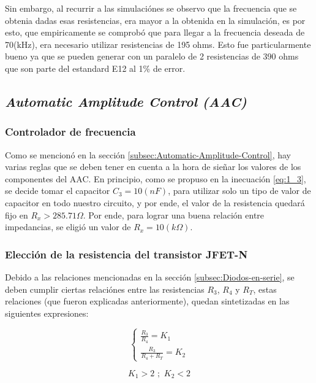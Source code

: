 Sin embargo, al recurrir a las simulaciónes se observo que la frecuencia
que se obtenia dadas esas resistencias, era mayor a la obtenida en
la simulación, es por esto, que empiricamente se comprobó que para
llegar a la frecuencia deseada de 70(kHz), era necesario utilizar
resistencias de 195 ohms. Esto fue particularmente bueno ya que se
pueden generar con un paralelo de 2 resistencias de 390 ohms que son
parte del estandard E12 al 1\% de error.

\subsection{\emph{Automatic Amplitude Control (AAC)}}

\subsubsection{Controlador de frecuencia}

Como se mencionó en la sección \ref{subsec:Automatic-Amplitude-Control},
hay varias reglas que se deben tener en cuenta a la hora de sieñar
los valores de los componentes del AAC. En principio, como se propuso
en la inecuación \ref{eq:1_3}, se decide tomar el capacitor $C_{3}=10(nF)$,
para utilizar solo un tipo de valor de capacitor en todo nuestro circuito,
y por ende, el valor de la resistencia quedará fijo en $R_{x}>285.71\Omega$.
Por ende, para lograr una buena relación entre impedancias, se eligió
un valor de $R_{x}=10(k\Omega)$.

\subsubsection{Elección de la resistencia del transistor JFET-N}

Debido a las relaciones mencionadas en la sección \ref{subsec:Diodos-en-serie},
se deben cumplir ciertas relaciónes entre las resistencias $R_{3}$,
$R_{4}$ y $R_{T}$, estas relaciones (que fueron explicadas anteriormente),
quedan sintetizadas en las siguientes expresiones:

\[
\left\{ \begin{array}{c}
\frac{R_{3}}{R_{4}}=K_{1}\\
\frac{R_{3}}{R_{4}+R_{T}}=K_{2}
\end{array}\right.
\]

\[
K_{1}>2\,\,;\,\,K_{2}<2
\]

